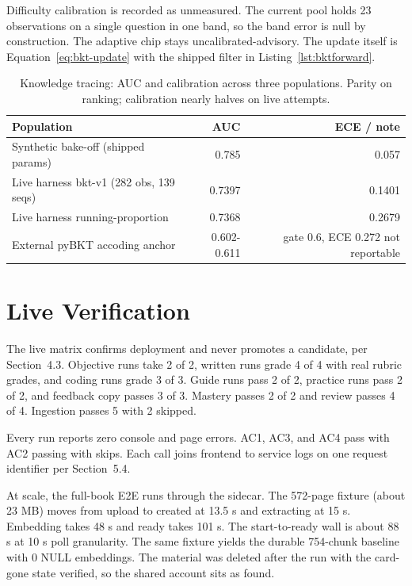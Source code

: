 Difficulty calibration is recorded as unmeasured. The current pool holds 23 observations on a single question in one band, so the band error is null by construction. The adaptive chip stays uncalibrated-advisory. The update itself is Equation~\ref{eq:bkt-update} with the shipped filter in Listing~\ref{lst:bktforward}.

\begin{table}[htbp]
\centering
\footnotesize
\caption{Knowledge tracing: AUC and calibration across three populations. Parity on ranking; calibration nearly halves on live attempts.}
\label{tab:res-bkt}
\begin{tabular}{l r r}
\toprule
\textbf{Population} & \textbf{AUC} & \textbf{ECE / note} \\
\midrule
Synthetic bake-off (shipped params) & 0.785 & 0.057 \\
Live harness bkt-v1 (282 obs, 139 seqs) & 0.7397 & 0.1401 \\
Live harness running-proportion & 0.7368 & 0.2679 \\
 External pyBKT accoding anchor & 0.602-0.611 & gate 0.6, ECE 0.272 not reportable \\
\bottomrule
\end{tabular}
\end{table}

\section{Live Verification}
The live matrix confirms deployment and never promotes a candidate, per Section~4.3. Objective runs take 2 of 2, written runs grade 4 of 4 with real rubric grades, and coding runs grade 3 of 3. Guide runs pass 2 of 2, practice runs pass 2 of 2, and feedback copy passes 3 of 3. Mastery passes 2 of 2 and review passes 4 of 4. Ingestion passes 5 with 2 skipped.

Every run reports zero console and page errors. AC1, AC3, and AC4 pass with AC2 passing with skips. Each call joins frontend to service logs on one request identifier per Section~5.4.

At scale, the full-book E2E runs through the sidecar. The 572-page fixture (about 23 MB) moves from upload to created at 13.5 s and extracting at 15 s. Embedding takes 48 s and ready takes 101 s. The start-to-ready wall is about 88 s at 10 s poll granularity. The same fixture yields the durable 754-chunk baseline with 0 NULL embeddings. The material was deleted after the run with the card-gone state verified, so the shared account sits as found.

